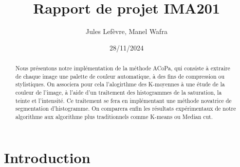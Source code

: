 \documentclass{article}
\title{Rapport de projet IMA201}
\author{Jules Lefèvre, Manel Wafra}
\date{28/11/2024}
\begin{document}
\maketitle
\begin{abstract}
    Nous présentons notre implémentation de la méthode ACoPa, qui consiste à extraire de chaque image une palette de couleur automatique, à des fins de compression ou stylistiques. On associera pour cela l'alogirthme des K-moyennes à une étude de la couleur de l'image, à l'aide d'un traîtement des histogrammes de la saturation, la teinte et l'intensité. Ce traîtement se fera en implémentant une méthode novatrice de segmentation d'histogramme. On comparera enfin les résultats expérimentaux de notre algorithme aux algorithme plus traditionnels comme K-means ou Median cut.
\end{abstract}
\section{Introduction}
\end{document}
